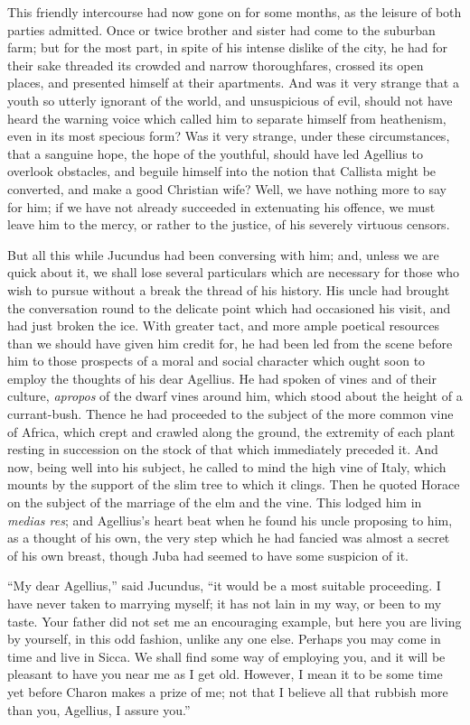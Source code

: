 This friendly intercourse had now gone on for some months, as the
leisure of both parties admitted. Once or twice brother and sister had
come to the suburban farm; but for the most part, in spite of his
intense dislike of the city, he had for their sake threaded its
crowded and narrow thoroughfares, crossed its open places, and
presented himself at their apartments. And was it very strange that a
youth so utterly ignorant of the world, and unsuspicious of evil,
should not have heard the warning voice which called him to separate
himself from heathenism, even in its most specious form? Was it very
strange, under these circumstances, that a sanguine hope, the hope of
the youthful, should have led Agellius to overlook obstacles, and
beguile himself into the notion that Callista might be converted, and
make a good Christian wife? Well, we have nothing more to say for him;
if we have not already succeeded in extenuating his offence, we must
leave him to the mercy, or rather to the justice, of his severely
virtuous censors.

But all this while Jucundus had been conversing with him; and,
unless we are quick about it, we shall lose several particulars which
are necessary for those who wish to pursue without a break the thread
of his history. His uncle had brought the conversation round to the
delicate point which had occasioned his visit, and had just
broken the ice. With greater tact, and more ample poetical resources
than we should have given him credit for, he had been led from the
scene before him to those prospects of a moral and social character
which ought soon to employ the thoughts of his dear Agellius. He had
spoken of vines and of their culture, \emph{apropos} of the dwarf
vines around him, which stood about the height of a currant-bush.
Thence he had proceeded to the subject of the more common vine of
Africa, which crept and crawled along the ground, the extremity of
each plant resting in succession on the stock of that which
immediately preceded it. And now, being well into his subject, he
called to mind the high vine of Italy, which mounts by the support of
the slim tree to which it clings. Then he quoted Horace on the subject
of the marriage of the elm and the vine. This lodged him in \emph{medias
res}; and Agellius's heart beat when he found his uncle proposing
to him, as a thought of his own, the very step which he had fancied
was almost a secret of his own breast, though Juba had seemed to have
some suspicion of it.

``My dear Agellius,'' said Jucundus, ``it would be a
most suitable proceeding. I have never taken to marrying myself; it
has not lain in my way, or been to my taste. Your father did not set
me an encouraging example, but here you are living by yourself, in
this odd fashion, unlike any one else. Perhaps you may come in time
and live in Sicca. We shall find some way of employing you, and it
will be pleasant to have you near me as I get old. However, I
mean it to be some time yet before Charon makes a prize of me; not
that I believe all that rubbish more than you, Agellius, I assure
you.''

